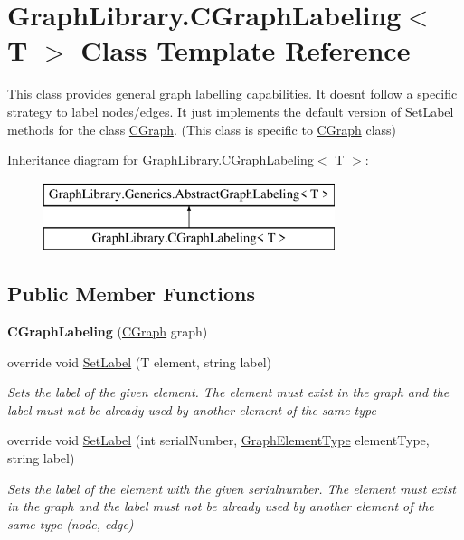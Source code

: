 \hypertarget{class_graph_library_1_1_c_graph_labeling}{}\section{Graph\+Library.\+C\+Graph\+Labeling$<$ T $>$ Class Template Reference}
\label{class_graph_library_1_1_c_graph_labeling}


This class provides general graph labelling capabilities. It doesn\textquotesingle{}t follow a specific strategy to label nodes/edges. It just implements the default version of Set\+Label methods for the class \hyperlink{class_graph_library_1_1_c_graph}{C\+Graph}. (This class is specific to \hyperlink{class_graph_library_1_1_c_graph}{C\+Graph} class)  


Inheritance diagram for Graph\+Library.\+C\+Graph\+Labeling$<$ T $>$\+:\begin{figure}[H]
\begin{center}
\leavevmode
\includegraphics[height=2.000000cm]{class_graph_library_1_1_c_graph_labeling}
\end{center}
\end{figure}
\subsection*{Public Member Functions}
\begin{DoxyCompactItemize}
\item 
\hypertarget{class_graph_library_1_1_c_graph_labeling_a44b3f485518381900722bd80796a3f8c}{}{\bfseries C\+Graph\+Labeling} (\hyperlink{class_graph_library_1_1_c_graph}{C\+Graph} graph)\label{class_graph_library_1_1_c_graph_labeling_a44b3f485518381900722bd80796a3f8c}

\item 
override void \hyperlink{class_graph_library_1_1_c_graph_labeling_accff39c0e47f50e582586e91da5a217f}{Set\+Label} (T element, string label)
\begin{DoxyCompactList}\small\item\em Sets the label of the given element. The element must exist in the graph and the label must not be already used by another element of the same type \end{DoxyCompactList}\item 
override void \hyperlink{class_graph_library_1_1_c_graph_labeling_abc0c9a99fd0ed7d21d3294c017587888}{Set\+Label} (int serial\+Number, \hyperlink{namespace_graph_library_1_1_generics_a919a165f16deccdd1b3d7e8a93423fbc}{Graph\+Element\+Type} element\+Type, string label)
\begin{DoxyCompactList}\small\item\em Sets the label of the element with the given serialnumber. The element must exist in the graph and the label must not be already used by another element of the same type (node, edge) \end{DoxyCompactList}\end{DoxyCompactItemize}

